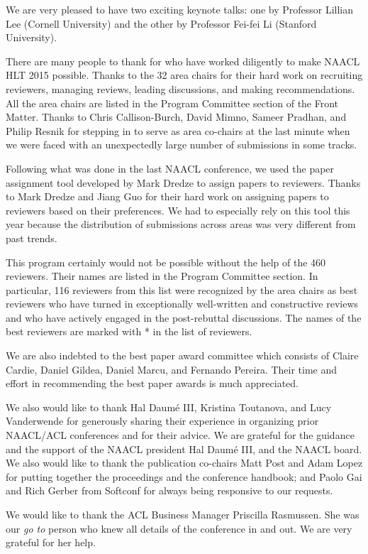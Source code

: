 We are very pleased to have two exciting keynote talks: one by
Professor Lillian Lee (Cornell University) and the other by Professor
Fei-fei Li (Stanford University).

There are many people to thank for who have worked diligently to
make NAACL HLT 2015 possible. Thanks to the 32 area chairs
for their hard work on recruiting reviewers, managing reviews,
leading discussions, and making recommendations.  All the area
chairs are listed in the Program Committee section of the Front
Matter.  Thanks to Chris Callison-Burch, David Mimno,
Sameer Pradhan, and Philip Resnik for stepping in to serve as area
co-chairs at the last minute when we were faced with an unexpectedly
large number of submissions in some tracks.

Following what was done in the last NAACL conference, we used the
paper assignment tool developed by Mark Dredze to assign papers to
reviewers.  Thanks to Mark Dredze and Jiang Guo for
their hard work on assigning papers to reviewers based on their
preferences.  We had to especially rely on this tool this year
because the distribution of submissions across areas was very
different from past trends.

This program certainly would not be possible without the help of
the 460 reviewers. Their names are listed in the Program Committee
section.  In particular, 116 reviewers from this list were recognized
by the area chairs as best reviewers who have turned in exceptionally
well-written and constructive reviews and who have actively engaged in
the post-rebuttal discussions. The names of the best reviewers are
marked with * in the list of reviewers. 

We are also indebted to the best paper award committee which consists
of Claire Cardie, Daniel Gildea, Daniel Marcu, and Fernando Pereira.
Their time and effort in recommending the best paper awards is much
appreciated.

We also would like to thank Hal Daum\'{e} III, Kristina Toutanova,
and Lucy Vanderwende for generously sharing their experience in
organizing prior NAACL/ACL conferences and for their advice. We are
grateful for the guidance and the support of the NAACL president
Hal Daum\'{e} III, and the NAACL board. We also would like to thank
the publication co-chairs Matt Post and Adam Lopez for putting
together the proceedings and the conference handbook; and Paolo Gai
and Rich Gerber from Softconf for always being responsive to our
requests. 

We would like to thank the ACL Business Manager Priscilla Rasmussen.
She was our {\em go to} person who knew all details of the conference
in and out.  We are very grateful for her help.

